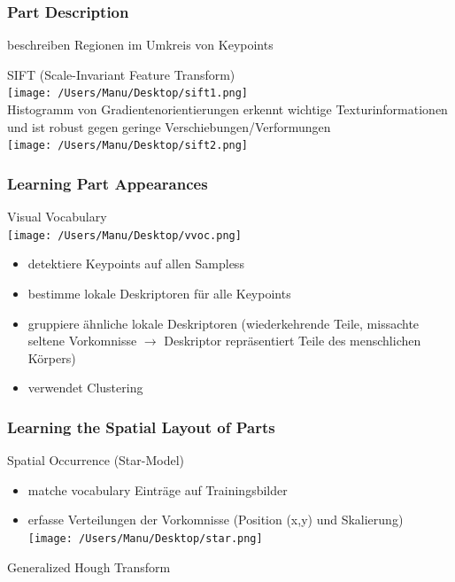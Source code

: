 \documentclass[paper=a4, fontsize=11pt]{scrartcl} %
\numberwithin{equation}{section} %
\numberwithin{figure}{section} %
\numberwithin{table}{section} %
\begin{document}
\subsubsection{Part Description}

beschreiben Regionen im Umkreis von Keypoints

SIFT (Scale-Invariant Feature Transform)\\
\texttt{[image: /Users/Manu/Desktop/sift1.png]}\\ 
Histogramm von Gradientenorientierungen erkennt wichtige Texturinformationen und ist robust gegen geringe Verschiebungen/Verformungen\\
\texttt{[image: /Users/Manu/Desktop/sift2.png]}


\subsubsection{Learning Part Appearances}

Visual Vocabulary\\ 
\texttt{[image: /Users/Manu/Desktop/vvoc.png]}

\begin{itemize}
\item detektiere Keypoints auf allen Sampless
\item bestimme lokale Deskriptoren für alle Keypoints
\item gruppiere ähnliche lokale Deskriptoren (wiederkehrende Teile, missachte seltene Vorkomnisse $\rightarrow$ Deskriptor repräsentiert Teile des menschlichen Körpers)
\item verwendet Clustering
\end{itemize}

\subsubsection{Learning the Spatial Layout of Parts}

Spatial Occurrence (Star-Model)

\begin{itemize}
\item matche vocabulary Einträge auf Trainingsbilder
\item erfasse Verteilungen der Vorkomnisse (Position (x,y) und Skalierung)\\ 
\texttt{[image: /Users/Manu/Desktop/star.png]}
\end{itemize}

Generalized Hough Transform
\end{document}
